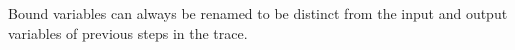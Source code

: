 


Bound variables can always be renamed to be distinct from the input and output variables of previous steps in the trace.









% 

